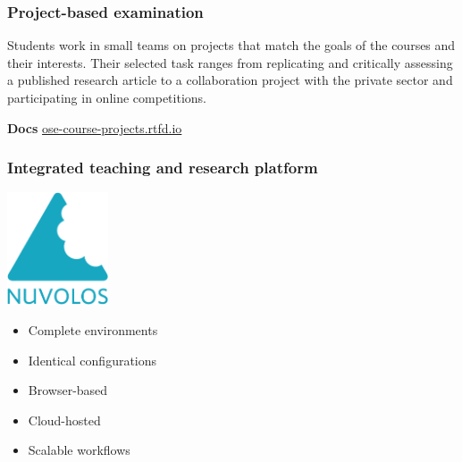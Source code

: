 \begin{frame}\frametitle{Project-based examination}

     Students work in small teams on projects that match the goals of the courses and their interests. Their selected task ranges from replicating and critically assessing a published research article to a collaboration project with the private sector and participating in online competitions.

    \textbf{Docs}\hspace{0.25cm} \url{ose-course-projects.rtfd.io}\vspace{0.5cm}

\end{frame}
\begin{frame}\frametitle{Integrated teaching and research platform}\vspace{1.25cm}

	\begin{multicols}{2}

	\hspace{1.3cm}\includegraphics[width=0.225\textwidth]{material/crop-nuvolos}


	\begin{itemize}\setlength\itemsep{1em}
		\item Complete environments
		\item Identical configurations
		\item Browser-based
		\item Cloud-hosted
		\item Scalable workflows
  \end{itemize}
  	  \end{multicols}

\end{frame}

